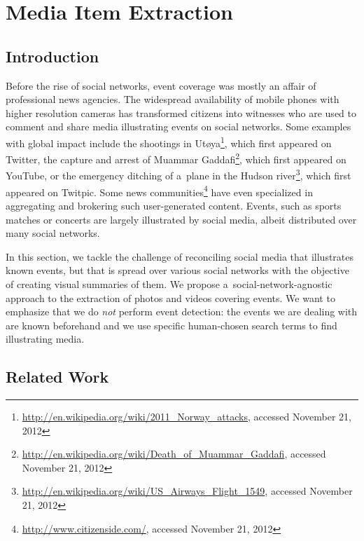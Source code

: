 \chapter{Media Item Extraction}
\label{cha:media-item-extraction}

\ifpdf
    \graphicspath{{5_media_item_extraction/figures/PNG/}{5_media_item_extraction/figures/PDF/}{5_media_item_extraction/figures/}}
\else
    \graphicspath{{5_media_item_extraction/figures/EPS/}{5_media_item_extraction/figures/}}
\fi

\section{Introduction}
\label{sec:introduction}

Before the rise of social networks,
event coverage was mostly an affair of professional news agencies.
The widespread availability of mobile phones
with higher resolution cameras has transformed
citizens into witnesses who are used to comment
and share media illustrating events on social networks.
Some examples with global impact
include the shootings in
Ut{\o}ya\footnote{\url{http://en.wikipedia.org/wiki/2011_Norway_attacks},
accessed November 21, 2012},
which first appeared on Twitter,
the capture and arrest of Muammar
Gaddafi\footnote{\url{http://en.wikipedia.org/wiki/Death_of_Muammar_Gaddafi},
accessed November 21, 2012},
which first appeared on YouTube,
or the emergency ditching of a~plane in the Hudson
river\footnote{\url{http://en.wikipedia.org/wiki/US_Airways_Flight_1549},
accessed November 21, 2012},
which first appeared on Twitpic.
Some news
communities\footnote{\url{http://www.citizenside.com/},
accessed November 21, 2012}
have even specialized in aggregating and brokering
such user-generated content.
Events, such as sports matches or concerts are 
largely illustrated by social media,
albeit distributed over many social networks.

In this section, we tackle the challenge of reconciling
social media that illustrates known events,
but that is spread over various social networks
with the objective of creating visual summaries of them.
We propose a~social-network-agnostic
approach to the extraction of photos and videos covering events.
We want to emphasize that we do \emph{not} perform event detection: 
the events we are dealing with are known beforehand
and we use specific human-chosen search terms
to find illustrating media.

\section{Related Work}
\label{sec:related-work}

